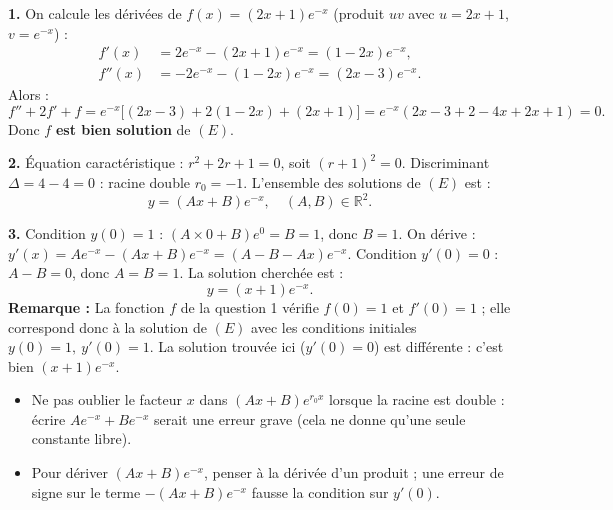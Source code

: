 \documentclass[11pt]{article}
\begin{document}
\begin{corrige}
\textbf{1.} On calcule les dérivées de $f(x) = (2x+1)e^{-x}$ (produit $uv$ avec $u = 2x+1$, $v = e^{-x}$) :
\begin{align*}
f'(x) &= 2e^{-x} - (2x+1)e^{-x} = (1-2x)e^{-x},\\
f''(x) &= -2e^{-x} - (1-2x)e^{-x} = (2x-3)e^{-x}.
\end{align*}
Alors :
\[ f'' + 2f' + f = e^{-x}\bigl[(2x-3) + 2(1-2x) + (2x+1)\bigr] = e^{-x}(2x - 3 + 2 - 4x + 2x + 1) = 0. \]
Donc $f$ \textbf{est bien solution} de $(E)$.

\textbf{2.} Équation caractéristique : $r^2 + 2r + 1 = 0$, soit $(r+1)^2 = 0$. Discriminant $\Delta = 4 - 4 = 0$ : racine double $r_0 = -1$.
L'ensemble des solutions de $(E)$ est :
\[ \boxed{y = (Ax + B)e^{-x},\quad (A, B) \in \mathbb{R}^2.} \]

\textbf{3.} Condition $y(0) = 1$ : $(A \times 0 + B)e^{0} = B = 1$, donc $B = 1$.
On dérive : $y'(x) = Ae^{-x} - (Ax + B)e^{-x} = (A - B - Ax)e^{-x}$.
Condition $y'(0) = 0$ : $A - B = 0$, donc $A = B = 1$.
La solution cherchée est :
\[ \boxed{y = (x + 1)e^{-x}.} \]
\textbf{Remarque :} La fonction $f$ de la question 1 vérifie $f(0)=1$ et $f'(0)=1$ ; elle correspond donc à la solution de $(E)$ avec les conditions initiales $y(0)=1,\ y'(0)=1$. La solution trouvée ici ($y'(0)=0$) est différente : c'est bien $(x+1)e^{-x}$.

\begin{attention}
\begin{itemize}
\item Ne pas oublier le facteur $x$ dans $(Ax+B)e^{r_0 x}$ lorsque la racine est double : écrire $Ae^{-x} + Be^{-x}$ serait une erreur grave (cela ne donne qu'une seule constante libre).
\item Pour dériver $(Ax+B)e^{-x}$, penser à la dérivée d'un produit ; une erreur de signe sur le terme $-(Ax+B)e^{-x}$ fausse la condition sur $y'(0)$.
\end{itemize}
\end{attention}
\end{corrige}
\end{document}
